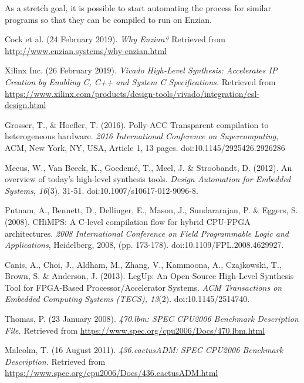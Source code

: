 \documentclass[12pt]{article}
\begin{document}
As a stretch goal, it is possible to start automating the process for similar programs so that they can be compiled to run on Enzian.
\begin{thebibliography}{3}
Cock et al. (24 February 2019). \textit{Why Enzian?}
Retrieved from \url{http://www.enzian.systems/why-enzian.html}

Xilinx Inc. (26 February 2019). \textit{Vivado High-Level Synthesis: Accelerates IP Creation by Enabling C, C++ and System C Specifications.}
Retrieved from \url{https://www.xilinx.com/products/design-tools/vivado/integration/esl-design.html}

Grosser, T., \& Hoefler, T. (2016). Polly-ACC Transparent compilation to heterogeneous hardware. \textit{2016 International Conference on Supercomputing}, ACM, New York, NY, USA, Article 1, 13 pages. doi:10.1145/2925426.2926286

Meeus, W., Van Beeck, K., Goedem{\'e}, T., Meel, J. \& Stroobandt, D. (2012). An overview of today's high-level synthesis tools. \textit{Design Automation for Embedded Systems, 16}(3), 31-51. doi:10.1007/s10617-012-9096-8.

Putnam, A., Bennett, D., Dellinger, E., Mason, J., Sundararajan, P. \& Eggers, S. (2008). CHiMPS: A C-level compilation flow for hybrid CPU-FPGA architectures. \textit{2008 International Conference on Field Programmable Logic and Applications}, Heidelberg, 2008, (pp. 173-178). doi:10.1109/FPL.2008.4629927. 

Canis, A., Choi, J., Aldham, M., Zhang, V., Kammoona, A., Czajkowski, T., Brown, S. \& Anderson, J. (2013). LegUp: An Open-Source High-Level Synthesis Tool for FPGA-Based Processor/Accelerator Systems. \textit{ACM Transactions on Embedded Computing Systems (TECS), 13}(2). doi:10.1145/2514740. 

Thomas, P. (23 January 2008). \textit{470.lbm: SPEC CPU2006 Benchmark Description File.}
Retrieved from \url{https://www.spec.org/cpu2006/Docs/470.lbm.html}

Malcolm, T. (16 August 2011). \textit{436.cactusADM: SPEC CPU2006 Benchmark Description.}
Retrieved from \url{https://www.spec.org/cpu2006/Docs/436.cactusADM.html}

\end{thebibliography}

\newpage
\end{document}
